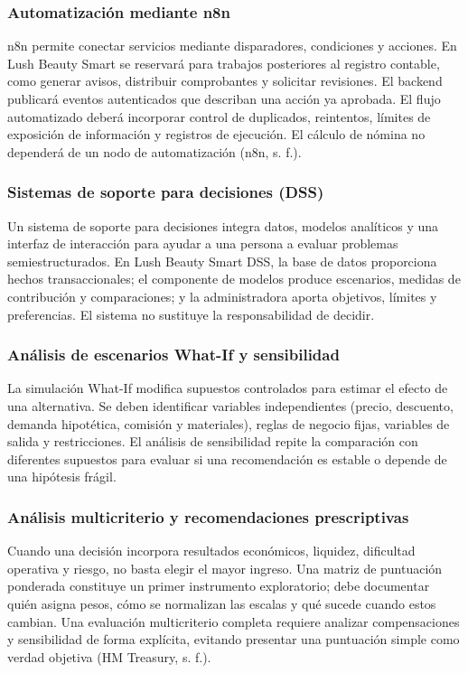 \subsubsection{Automatización mediante n8n}

n8n permite conectar servicios mediante disparadores, condiciones y acciones. En Lush Beauty Smart se reservará para trabajos posteriores al registro contable, como generar avisos, distribuir comprobantes y solicitar revisiones. El backend publicará eventos autenticados que describan una acción ya aprobada. El flujo automatizado deberá incorporar control de duplicados, reintentos, límites de exposición de información y registros de ejecución. El cálculo de nómina no dependerá de un nodo de automatización (n8n, s. f.).

\subsubsection{Sistemas de soporte para decisiones (DSS)}\label{sec:dss}

Un sistema de soporte para decisiones integra datos, modelos analíticos y una interfaz de interacción para ayudar a una persona a evaluar problemas semiestructurados. En Lush Beauty Smart DSS, la base de datos proporciona hechos transaccionales; el componente de modelos produce escenarios, medidas de contribución y comparaciones; y la administradora aporta objetivos, límites y preferencias. El sistema no sustituye la responsabilidad de decidir.

\subsubsection{Análisis de escenarios What-If y sensibilidad}

La simulación What-If modifica supuestos controlados para estimar el efecto de una alternativa. Se deben identificar variables independientes (precio, descuento, demanda hipotética, comisión y materiales), reglas de negocio fijas, variables de salida y restricciones. El análisis de sensibilidad repite la comparación con diferentes supuestos para evaluar si una recomendación es estable o depende de una hipótesis frágil.

\subsubsection{Análisis multicriterio y recomendaciones prescriptivas}

Cuando una decisión incorpora resultados económicos, liquidez, dificultad operativa y riesgo, no basta elegir el mayor ingreso. Una matriz de puntuación ponderada constituye un primer instrumento exploratorio; debe documentar quién asigna pesos, cómo se normalizan las escalas y qué sucede cuando estos cambian. Una evaluación multicriterio completa requiere analizar compensaciones y sensibilidad de forma explícita, evitando presentar una puntuación simple como verdad objetiva (HM Treasury, s. f.).

